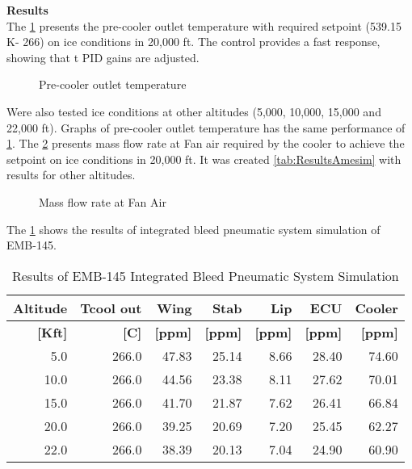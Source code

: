 \textbf{Results}\\

The \ref{fig:PCT} presents the pre-cooler outlet temperature with required setpoint (539.15 K- 266\celsius) on ice conditions in 20,000 ft. The control provides a fast response, showing that t PID gains are adjusted.

\begin{figure}[H] %
\caption{Pre-cooler outlet temperature}
\label{fig:PCT}
\end{figure}

Were also tested ice conditions at other altitudes (5,000, 10,000, 15,000 and 22,000 ft). Graphs of pre-cooler outlet temperature has the same performance of \ref{fig:PCT}.
The \ref{fig:Flowrate} presents mass flow rate at Fan air required by the cooler to achieve the setpoint on ice conditions in 20,000 ft. It was created \ref{tab:ResultsAmesim} with results for other altitudes.

\begin{figure}[H] %
\caption{Mass flow rate at Fan Air}
\label{fig:Flowrate}
\end{figure}

The \ref{tab:ResultsIBPS} shows the results of integrated bleed pneumatic system simulation of EMB-145.

\begin{table}[htbp]
  \centering
  \caption{Results of EMB-145 Integrated Bleed Pneumatic System Simulation}
    \begin{tabular}{rrrrrrr}
    \toprule
    \textbf{Altitude} & \textbf{Tcool out} & \textbf{Wing} & \textbf{Stab} & \textbf{Lip} & \textbf{ECU} & \textbf{Cooler} \\
    \midrule
    \textbf{[Kft]} & \textbf{[C]} & \textbf{[ppm]} & \textbf{[ppm]} & \textbf{[ppm]} & \textbf{[ppm]} & \textbf{[ppm]} \\
    5.0   & 266.0 & 47.83 & 25.14 & 8.66  & 28.40 & 74.60 \\
    10.0  & 266.0 & 44.56 & 23.38 & 8.11  & 27.62 & 70.01 \\
    15.0  & 266.0 & 41.70 & 21.87 & 7.62  & 26.41 & 66.84 \\
    20.0  & 266.0 & 39.25 & 20.69 & 7.20  & 25.45 & 62.27 \\
    22.0  & 266.0 & 38.39 & 20.13 & 7.04  & 24.90 & 60.90 \\
    \bottomrule
    \end{tabular}%
  \label{tab:ResultsIBPS}%
\end{table}%

